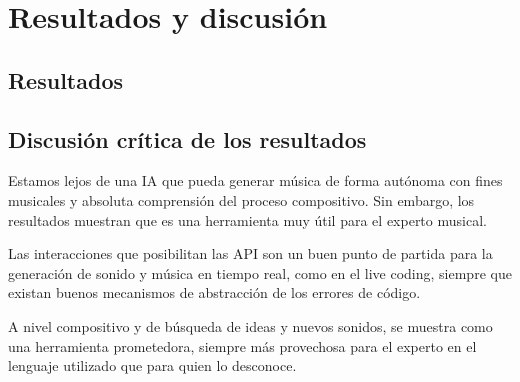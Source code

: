\chapter{Resultados y discusión}

\section{Resultados}

\section{Discusión crítica de los resultados}
Estamos lejos de una IA que pueda generar música de forma autónoma con fines musicales y absoluta comprensión del proceso compositivo. Sin embargo, los resultados muestran que es una herramienta muy útil para el experto musical.

Las interacciones que posibilitan las API son un buen punto de partida para la generación de sonido y música en tiempo real, como en el live coding, siempre que existan buenos mecanismos de abstracción de los errores de código.

A nivel compositivo y de búsqueda de ideas y nuevos sonidos, se muestra como una herramienta prometedora, siempre más provechosa para el experto en el lenguaje utilizado que para quien lo desconoce.



